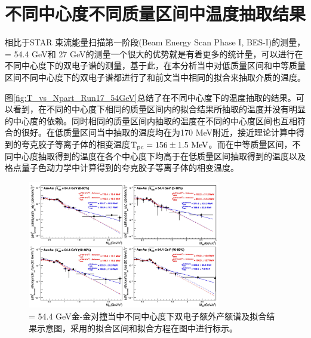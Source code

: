 \section{不同中心度不同质量区间中温度抽取结果}

相比于STAR 束流能量扫描第一阶段(Beam Energy Scan Phase I, BES-I)的测量，\sNN = 54.4 GeV和 27 GeV的测量一个很大的优势就是有着更多的统计量，可以进行在不同中心度下的双电子谱的测量，基于此，在本分析当中对低质量区间和中等质量区间不同中心度下的双电子谱都进行了和前文当中相同的拟合来抽取介质的温度。

图\ref{fig:T_vs_Npart_Run17_54GeV}总结了在不同中心度下的温度抽取的结果。可以看到，在不同的中心度下相同的质量区间内的拟合结果所抽取的温度并没有明显的中心度的依赖。同时相同的质量区间内抽取的温度在不同的中心度区间也互相符合的很好。在低质量区间当中抽取的温度均在为170 MeV附近，接近理论计算中得到的夸克胶子等离子体的相变温度${\rm T_{pc} = 156 \pm 1.5 ~MeV}$。而在中等质量区间，不同中心度抽取得到的温度在各个中心度下均高于在低质量区间抽取得到的温度以及格点量子色动力学中计算得到的夸克胶子等离子体的相变温度。

\begin{figure}[htb]
    \begin{center}
    \includegraphics[width=0.75\textwidth,clip]{figures/Chapter4/Excess_fit.pdf}
    \end{center}
    \caption[\sNN = 54.4 GeV金-金对撞当中不同中心度下双电子额外产额谱及拟合结果示意图]{\sNN = 54.4 GeV金-金对撞当中不同中心度下双电子额外产额谱及拟合结果示意图，采用的拟合区间和拟合方程在图中进行标示。}
    \label{fig:Excess_fit}
\end{figure}

